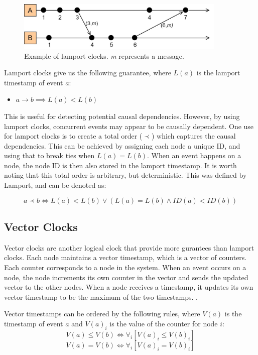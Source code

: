 \documentclass[12pt]{report}
\begin{document}
\begin{figure}
    \centering
    \includegraphics[width=10cm]{LamportClocks.jpg}
    \caption{Example of lamport clocks. \textit{m} represents a message.}
    \label{fig:lamport}
\end{figure}

Lamport clocks give us the following guarantee, where $L(a)$ is the lamport timestamp of event $a$: 
\begin{itemize}
    \item $a \rightarrow b \implies  L(a) < L(b)$
\end{itemize}
This is useful for detecting potential causal dependencies. However, by using lamport clocks, concurrent events may appear to be causally dependent. One use for lamport clocks is to create a total order ($\prec$) which captures the causal dependencies. This can be achieved by assigning each node a unique ID, and using that to break ties when $L(a) = L(b)$. When an event happens on a node, the node ID is then also stored in the lamport timestamp. It is worth noting that this total order is arbitrary, but deterministic. This was defined by Lamport\cite{lamport1978time}, and can be denoted as:\par
\[a \prec b \iff L(a) < L(b) \lor (L(a) = L(b) \land ID(a) < ID(b))\]

\subsection{Vector Clocks}
Vector clocks are another logical clock that provide more gurantees than lamport clocks. Each node maintains a vector timestamp, which is a vector of counters. Each counter corresponds to a node in the system.
When an event occurs on a node, the node increments its own counter in the vector and sends the updated vector to the other nodes.
When a node receives a timestamp, it updates its own vector timestamp to be the maximum of the two timestamps. \cite{mattern1989virtual}.\par

Vector timestamps can be ordered by the following rules, where $V(a)$ is the timestamp of event $a$ and $V(a)_i$ is the value of the counter for node $i$:
\[V(a) \leq V(b) \iff \forall_i [V(a)_i \leq V(b)_i]  \]
\[V(a) = V(b) \iff \forall_i [V(a)_i = V(b)_i]\]
\end{document}
